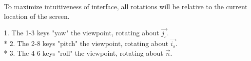 \documentclass[12pt]{article}
\begin{document}
	To maximize intuitiveness of interface, all rotations will be relative to the current location of the screen. 
	
		1. The 1-3 keys "yaw" the viewpoint, rotating about $\vec{j_{s}}$. \\*
		2. The 2-8 keys "pitch" the viewpoint, rotating about $\vec{i_{s}}$. \\*
		3. The 4-6 keys "roll" the viewpoint, rotating about $\vec{n}$.		
	
\end{document}
